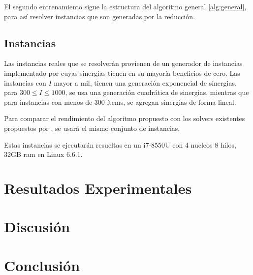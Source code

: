 \documentclass[spanish, a4paper, 12pt, twoside, openany,final]{book}
\numberwithin{equation}{section}
\begin{document}
El segundo entrenamiento sigue la estructura del algoritmo general \ref{alg:general}, para así resolver instancias que son generadas por la reducción.




\section{Instancias}

Las instancias reales que se resolverán provienen de un generador de instancias implementado por \cite{baldo_polynomial_2023} cuyas sinergias tienen en su mayoría beneficios de cero. Las instancias con $I$ mayor a mil, tienen una generación exponencial de sinergias, para $300 \le I \le 1000$, se usa una generación cuadrática de sinergias, mientras que para instancias con menos de 300 ítems, se agregan sinergias de forma lineal.

Para comparar el rendimiento del algoritmo propuesto con los solvers existentes propuestos por \cite{baldo_polynomial_2023}, se usará el mismo conjunto de instancias.

Estas instancias se ejecutarán resueltas en un i7-8550U con 4 nucleos 8 hilos, 32GB ram en Linux 6.6.1.

 
\clearpage
\chapter{Resultados Experimentales}






\chapter{Discusión}
    
\clearpage


\chapter{Conclusión}
    
\clearpage

\newpage
\renewcommand\refname{Referencias}          %
{                           %
}
\end{document}
